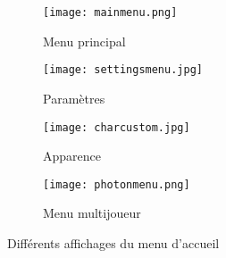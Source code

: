 \documentclass[../doc.tex]{subfiles}
\begin{document}
    \begin{figure}[hbt!]
                \centering
                \captionsetup{justification=centering}
                \begin{subfigure}[b]{0.3\textwidth}
                    \texttt{[image: mainmenu.png]} 
                    \caption{Menu principal}
                \end{subfigure}
                \hspace{150pt}
                \begin{subfigure}[b]{0.3\textwidth}
                    \texttt{[image: settingsmenu.jpg]} 
                    \caption{Paramètres}
                \end{subfigure}
                \begin{subfigure}[b]{0.3\textwidth}
                    \texttt{[image: charcustom.jpg]} 
                    \caption{Apparence}
                \end{subfigure}
                \begin{subfigure}[b]{0.3\textwidth}
                    \texttt{[image: photonmenu.png]} 
                    \caption{Menu multijoueur}
                \end{subfigure}
                \caption{Différents affichages du menu d'accueil}
    \end{figure}
\end{document}
